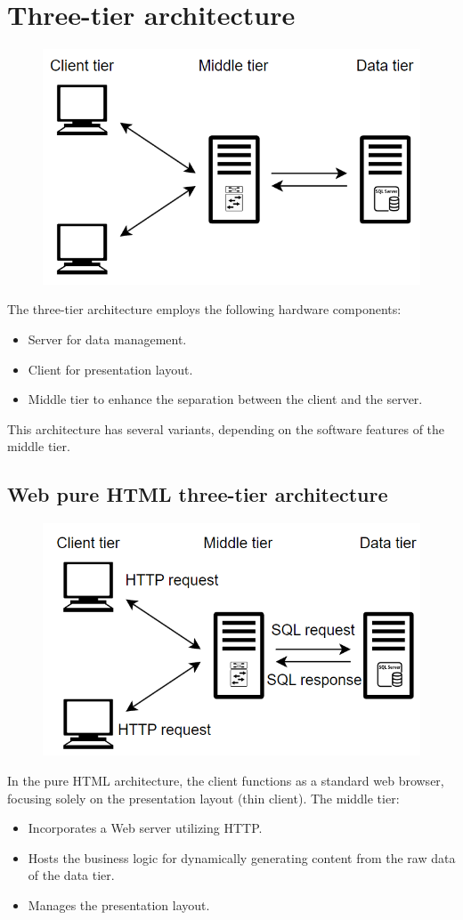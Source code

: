 \section{Three-tier architecture}

\begin{figure}[H]
    \centering
    \includegraphics[width=0.35\linewidth]{images/tt.png}
\end{figure}
The three-tier architecture employs the following hardware components:
\begin{itemize}
    \item Server for data management. 
    \item Client for presentation layout. 
    \item Middle tier to enhance the separation between the client and the server.
\end{itemize}
This architecture has several variants, depending on the software features of the middle tier. 

\subsection{Web pure HTML three-tier architecture}
\begin{figure}[H]
    \centering
    \includegraphics[width=0.35\linewidth]{images/ttph.png}
\end{figure}
In the pure HTML architecture, the client functions as a standard web browser, focusing solely on the presentation layout (thin client). 
The middle tier:
\begin{itemize}
    \item Incorporates a Web server utilizing HTTP.
    \item Hosts the business logic for dynamically generating content from the raw data of the data tier. 
    \item Manages the presentation layout.
\end{itemize}

